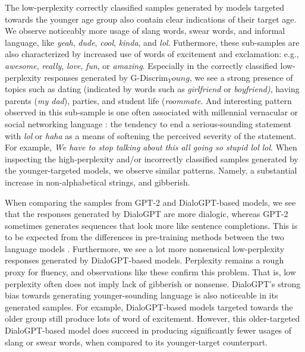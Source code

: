 The low-perplexity correctly classified samples generated by models targeted towards the younger age group also contain clear indications of their target age. We observe noticeably more usage of slang words, swear words, and informal language, like \textit{yeah}, \textit{dude}, \textit{cool}, \textit{kinda}, and \textit{lol}. Futhermore, these sub-samples are also characterized by increased use of words of excitement and exclamation: e.g., \textit{awesome}, \textit{really}, \textit{love}, \textit{fun}, or \textit{amazing}. Especially in the correctly classified low-perplexity responses generated by G-Discrim${_Young}$, we see a strong presence of topics such as dating (indicated by words such as \textit{girlfriend} or \textit{boyfriend)}, having parents (\textit{my dad}), parties, and student life (\textit{roommate}. And interesting pattern observed in this sub-sample is one often associated with millennial vernacular or social networking language : the tendency to end a serious-sounding statement with \textit{lol} or \textit{haha} as a means of softening the perceived severity of the statement. For example, \textit{We have to stop talking about this all going so stupid lol lol}. When inspecting the high-perplexity and/or incorrectly classified samples generated by the younger-targeted models, we observe similar patterns. Namely, a substantial increase in non-alphabetical strings, and gibberish.

When comparing the samples from GPT-2 and DialoGPT-based models, we see that the responses generated by DialoGPT are more dialogic, whereas GPT-2 sometimes generates sequences that look more like sentence completions. This is to be expected from the differences in pre-training methods between the two language models \citep{zhang2019dialogpt}. Furthermore, we see a lot more nonsensical low-perplexity responses generated by DialoGPT-based models. Perplexity remains a rough proxy for fluency, and observations like these confirm this problem. That is, low perplexity often does not imply lack of gibberish or nonsense. DialoGPT's strong bias towards generating younger-sounding language is also noticeable in its generated samples. For example, DialoGPT-based models targeted towards the older group still produce lots of word of excitement. However, this older-targeted DialoGPT-based model does succeed in producing significantly fewer usages of slang or swear words, when compared to its younger-target counterpart.



